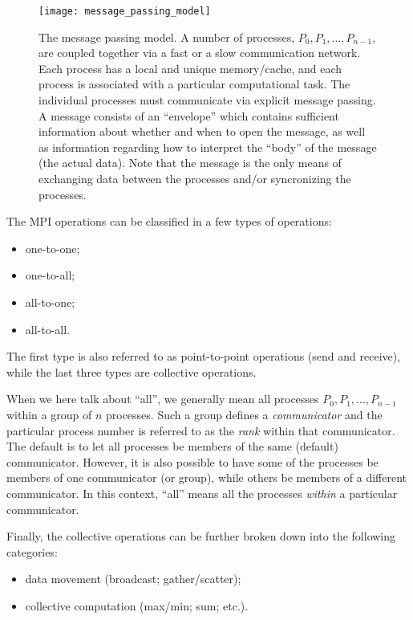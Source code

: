 \begin{figure}[htbp]
  \begin{center}
    \texttt{[image: message\_passing\_model]}
  \end{center}
  \caption{
    The message passing model. A number of processes, $P_0, P_1, \ldots,
    P_{n-1}$, are coupled together via a fast or a slow communication network.
    Each process has a local and unique memory/cache, and each process is
    associated with a particular computational task. The individual processes
    must communicate via explicit message passing. A message consists of an
    ``envelope'' which contains sufficient information about whether and when to
    open the message, as well as information regarding how to interpret the
    ``body'' of the message (the actual data). Note that the message is the only
    means of exchanging data between the processes and/or syncronizing the
    processes.
  }
  \label{fig:message_passing_model}
\end{figure}

The MPI operations can be classified in a few types of operations:
\begin{itemize}
\item one-to-one;
\item one-to-all;
\item all-to-one;
\item all-to-all.
\end{itemize}
The first type is also referred to as point-to-point operations (send and
receive), while the last three types are collective operations.

When we here talk about ``all'', we generally mean all processes $P_0, P_1,
\ldots, P_{n-1}$ within a group of $n$ processes. Such a group defines a
\emph{communicator} and the particular process number is referred to as the
\emph{rank} within that communicator. The default is to let all processes be
members of the same (default) communicator. However, it is also possible to have
some of the processes be members of one communicator (or group), while others be
members of a different communicator. In this context, ``all'' means all the
processes \emph{within} a particular communicator.

Finally, the collective operations can be further broken down into the
following categories:
\begin{itemize}
\item data movement (broadcast; gather/scatter);
\item collective computation (max/min; sum; etc.).
\end{itemize}

